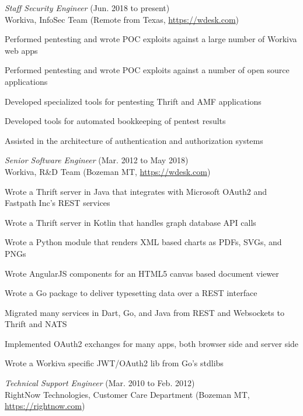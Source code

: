 \documentclass[10pt, a4paper]{article}
\begin{document}
\begin{itemize*}
  \item \emph{Staff Security Engineer} (Jun. 2018 to present)\\
    Workiva, InfoSec Team (Remote from Texas, \url{https://wdesk.com})
    \begin{itemize*}
    \item Performed pentesting and wrote POC exploits against a large number of Workiva web apps
    \item Performed pentesting and wrote POC exploits against a number of open source applications
    \item Developed specialized tools for pentesting Thrift and AMF applications
    \item Developed tools for automated bookkeeping of pentest results
    \item Assisted in the architecture of authentication and authorization systems
    \end{itemize*}
  \item \emph{Senior Software Engineer} (Mar. 2012 to May 2018)\\
    Workiva, R\&D Team (Bozeman MT, \url{https://wdesk.com})
    \begin{itemize*}
    \item Wrote a Thrift server in Java that integrates with Microsoft OAuth2 and Fastpath Inc's REST services
    \item Wrote a Thrift server in Kotlin that handles graph database API calls
    \item Wrote a Python module that renders XML based charts as PDFs, SVGs, and PNGs
    \item Wrote AngularJS components for an HTML5 canvas based document viewer
    \item Wrote a Go package to deliver typesetting data over a REST interface
    \item Migrated many services in Dart, Go, and Java from REST and Websockets to Thrift and NATS
    \item Implemented OAuth2 exchanges for many apps, both browser side and server side
    \item Wrote a Workiva specific JWT/OAuth2 lib from Go's stdlibs
    \end{itemize*}
  \item \emph{Technical Support Engineer} (Mar. 2010 to Feb. 2012)\\
    RightNow Technologies, Customer Care Department (Bozeman MT, \url{https://rightnow.com})

\end{itemize*}
\end{document}
